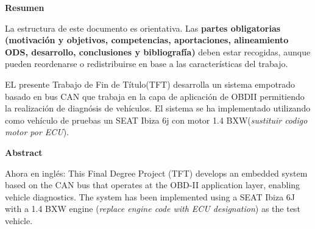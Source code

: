 {\setlength{\parskip}{8mm}
{\huge{\textbf{Resumen}}}

La estructura de este documento es orientativa. Las \textbf{partes obligatorias (motivación y objetivos, competencias, aportaciones, alineamiento ODS, desarrollo, conclusiones y bibliografía)} deben estar recogidas, aunque pueden reordenarse o redistribuirse en base a las características del trabajo.

    {EL presente Trabajo de Fin de Título(TFT) desarrolla un sistema empotrado basado en bus CAN que trabaja en la capa de aplicación de OBDII permitiendo la realización de diagnósis de vehículos. El sistema se ha implementado utilizando como vehículo de pruebas un SEAT Ibiza 6j con motor 1.4 BXW(\textit{sustituir codigo motor por ECU}).}

\newpage

{\huge{\textbf{Abstract}}}


    {\large{Ahora en inglés: 
    This Final Degree Project (TFT) develops an embedded system based on the CAN bus that operates at the OBD-II application layer, enabling vehicle diagnostics. The system has been implemented using a SEAT Ibiza 6J with a 1.4 BXW engine (\textit{replace engine code with ECU designation}) as the test vehicle.
 }

}}
